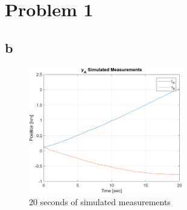 
\section{Problem 1}
\subsection{b}
\lipsum[23-27]
\begin{figure}[h!tbp]
    \centering
    \includegraphics[width=0.6\textwidth]{figs/p2pa.png}
    \caption{20 seconds of simulated measurements}
    \label{fig:p2_a}
\end{figure}
